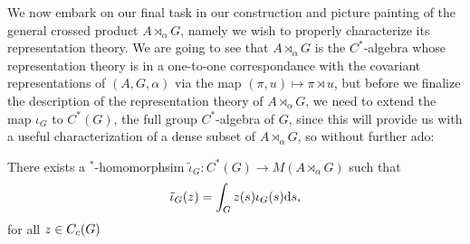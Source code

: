 We now embark on our final task in our construction and picture painting of the general crossed product $A \rtimes_ \alpha G$, namely we wish to properly characterize its representation theory. We are going to see that $A \rtimes_\alpha G$ is the $C^*$-algebra whose representation theory is in a one-to-one correspondance with the covariant representations of $(A,G,\alpha)$ via the map $(\pi,u) \mapsto \pi \rtimes u$, but before we finalize the description of the representation theory of $A \rtimes_\alpha G$, we need to extend the map $\iota_G$ to $C^*(G)$, the full group $C^*$-algebra of $G$, since this will provide us with a useful characterization of a dense subset of $A \rtimes_\alpha G$, so without further ado:
\begin{lemma}
	There exists a $^*$-homomorphsim $\tilde \iota_G \colon C^*(G) \to M(A \rtimes_\alpha G)$ such that
	\begin{align*}
		\tilde \iota_G(z) = \int_G z(s) \iota_G(s) \mathrm{d} s, 
	\end{align*}
	for all $z \in C_c(G)$
	\label{cross:2.35}
\end{lemma}

